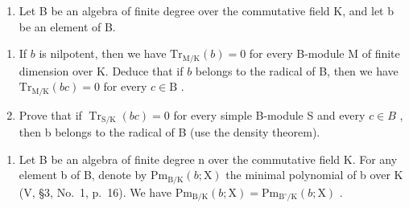 
\begin{enumerate}
\def\labelenumi{\arabic{enumi})}
\tightlist
\item
  Let B be an algebra of finite degree over the commutative field K, and let b be an element of B.
\end{enumerate}

\begin{enumerate}
\def\labelenumi{\alph{enumi})}
\item
  If \(b\) is nilpotent, then we have \(\mathrm{Tr}_{\mathrm{M / K}}(b) = 0\) for every B-module M of finite dimension over K. Deduce that if \(b\) belongs to the radical of B, then we have \(\mathrm{Tr}_{\mathrm{M / K}}(bc) = 0\) for every \(c \in \mathrm{B}\) .
\item
  Prove that if \(\operatorname{Tr}_{\mathrm{S}/\mathrm{K}}(bc)=0\) for every simple B-module S and every \(c\in B\) , then b belongs to the radical of B (use the density theorem).
\end{enumerate}

\begin{enumerate}
\def\labelenumi{\arabic{enumi})}
\setcounter{enumi}{1}
\tightlist
\item
  Let B be an algebra of finite degree n over the commutative field K. For any element b of B, denote by \(\mathrm{Pm}_{\mathrm{B}/\mathrm{K}}(b;\mathrm{X})\) the minimal polynomial of b over K (V, §3, No.~1, p.~16). We have \(\mathrm{Pm}_{\mathrm{B}/\mathrm{K}}(b;\mathrm{X})=\mathrm{Pm}_{\mathrm{B}^{\circ}/\mathrm{K}}(b;\mathrm{X})\) .
\end{enumerate}

